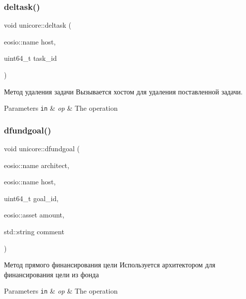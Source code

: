 \subsubsection{\texorpdfstring{deltask()}{deltask()}}
{\footnotesize\ttfamily void unicore\+::deltask (\begin{DoxyParamCaption}\item[{eosio\+::name}]{host,  }\item[{uint64\+\_\+t}]{task\+\_\+id }\end{DoxyParamCaption})}



Метод удаления задачи Вызывается хостом для удаления поставленной задачи. 


\begin{DoxyParams}[1]{Parameters}
\mbox{\tt in}  & {\em op} & The operation \\
\hline
\end{DoxyParams}
\mbox{\label{classunicore_a969e75dd90699b53b75ab8482cbc49d3}} 
\subsubsection{\texorpdfstring{dfundgoal()}{dfundgoal()}}
{\footnotesize\ttfamily void unicore\+::dfundgoal (\begin{DoxyParamCaption}\item[{eosio\+::name}]{architect,  }\item[{eosio\+::name}]{host,  }\item[{uint64\+\_\+t}]{goal\+\_\+id,  }\item[{eosio\+::asset}]{amount,  }\item[{std\+::string}]{comment }\end{DoxyParamCaption})}



Метод прямого финансирования цели Используется архитектором для финансирования цели из фонда 


\begin{DoxyParams}[1]{Parameters}
\mbox{\tt in}  & {\em op} & The operation \\
\hline
\end{DoxyParams}
\mbox{\label{classunicore_a403175c6abbcf360d36ec0259bccc109}} 
